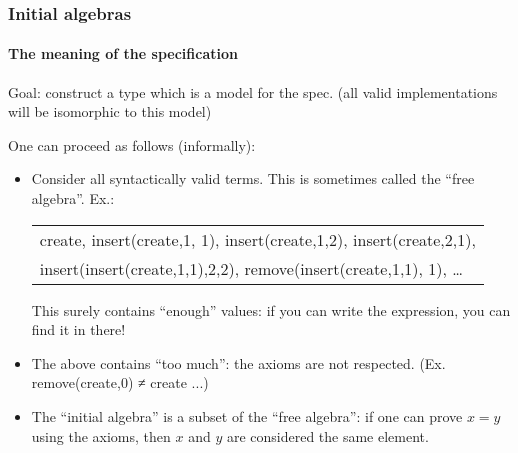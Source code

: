 \documentclass{beamer}
\begin{document}
\begin{frame}[fragile]
\frametitle{Initial algebras}
\framesubtitle{The meaning of the specification}
Goal: construct a type which is a model for the spec. 
(all valid implementations will be isomorphic to this model)
\vfill

One can proceed as follows (informally):
\begin{itemize}
\item Consider all syntactically valid terms. This is sometimes
called the ``free algebra''.
Ex.:
\\
\hspace*{0.5cm}
{\small\em
\begin{tabular}{l}
create, insert(create,1, 1), 
insert(create,1,2), insert(create,2,1),\\
insert(insert(create,1,1),2,2), remove(insert(create,1,1), 1), \ldots
\end{tabular}
}
This surely contains ``enough'' values: if you can write the expression, you
can find it in there!

\item The above contains ``too much'': the axioms are not respected.
(Ex. remove(create,0) ≠ create ...) 

\item The ``initial algebra'' is a subset of the ``free algebra'':
  if one can prove $x=y$ using the axioms, then $x$ and $y$ are
  considered the same element.
\end{itemize}
\end{frame}

\end{document}
